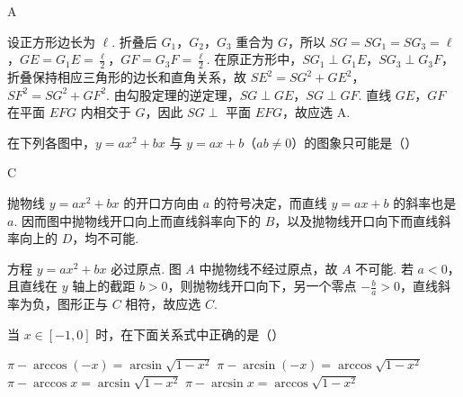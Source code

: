 \documentclass[UTF8,a4paper,oneside,11pt]{ctexbook}
\begin{document}
\begin{answer}
A
\end{answer}

\begin{solution}
设正方形边长为 \(\ell\). 折叠后 \(G_1\)，\(G_2\)，\(G_3\) 重合为 \(G\)，所以 \(SG=SG_1=SG_3=\ell\)，\(GE=G_1E=\frac{\ell}{2}\)，\(GF=G_3F=\frac{\ell}{2}\). 在原正方形中，\(SG_1\perp G_1E\)，\(SG_3\perp G_3F\)，折叠保持相应三角形的边长和直角关系，故
\(SE^2=SG^2+GE^2\)，\(SF^2=SG^2+GF^2\).
由勾股定理的逆定理，\(SG\perp GE\)，\(SG\perp GF\). 直线 \(GE\)，\(GF\) 在平面 \(EFG\) 内相交于 \(G\)，因此 \(SG\perp\) 平面 \(EFG\)，故应选 A.
\end{solution}

\begin{problem}

在下列各图中，\(y = ax^2 + bx\) 与 \(y = ax + b\)（\(ab \neq 0\)）的图象只可能是（\quad）

\choices
    {}
    {}
    {}
    {}
\end{problem}

\begin{answer}
C
\end{answer}

\begin{solution}
抛物线 \(y=ax^2+bx\) 的开口方向由 \(a\) 的符号决定，而直线 \(y=ax+b\) 的斜率也是 \(a\). 因而图中抛物线开口向上而直线斜率向下的 \(B\)，以及抛物线开口向下而直线斜率向上的 \(D\)，均不可能.

方程 \(y=ax^2+bx\) 必过原点. 图 \(A\) 中抛物线不经过原点，故 \(A\) 不可能. 若 \(a<0\)，且直线在 \(y\) 轴上的截距 \(b>0\)，则抛物线开口向下，另一个零点 \(-\frac{b}{a}>0\)，直线斜率为负，图形正与 \(C\) 相符，故应选 \(C\).
\end{solution}

\begin{problem}

当 \(x \in [-1,0]\) 时，在下面关系式中正确的是（\quad）

\choices
    {\(\pi - \arccos (-x) = \arcsin \sqrt{1 - x^2}\)}
    {\(\pi - \arcsin (-x) = \arccos \sqrt{1 - x^2}\)}
    {\(\pi - \arccos x = \arcsin \sqrt{1 - x^2}\)}
    {\(\pi - \arcsin x = \arccos \sqrt{1 - x^2}\)}
\end{problem}
\end{document}
